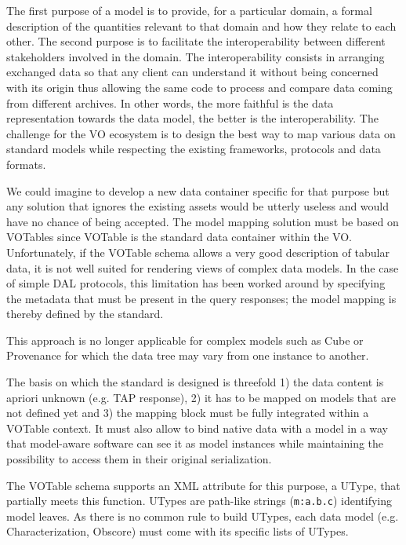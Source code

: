 
The first purpose of a model is to provide, for a particular domain, a formal description of the quantities relevant to that domain and how they relate to each other.
The second purpose is to facilitate the interoperability between  different stakeholders involved in the domain. The interoperability consists in arranging exchanged data 
so that any client can understand it without being concerned with its origin thus allowing the same code to process and compare data coming from different archives.  
In other words, the more faithful is the data representation towards the data model, the better is the interoperability.
The challenge for the VO ecosystem is to design the best way to map various data on standard models while respecting the existing frameworks, protocols and data formats.

We could imagine to develop a new data container specific for that purpose but any solution that ignores the existing assets would be utterly useless and would have no chance of being accepted.
The model mapping solution must be based on VOTables since VOTable  \citep{2019ivoa.spec.1021O} is the standard data container within the VO.
Unfortunately, if the VOTable schema allows a very good description of tabular data, it is not well suited for rendering views of complex data models.
In the case of simple DAL protocols, this limitation has been worked around by specifying the metadata that must be present in the query responses; the model mapping is thereby defined by the standard.

This approach is no longer applicable for complex models such as Cube or Provenance for which the data tree may vary from one instance to another.

The basis on which the standard is designed is threefold 1) the data content is apriori unknown (e.g. TAP response), 2) it has to be mapped on models that are not defined yet and 3) the mapping block must be fully integrated within a VOTable context.
It must also allow to bind native data with a model in a way that model-aware software can see it as model instances while maintaining the possibility to access them in their original serialization.

The VOTable schema supports an XML attribute for this purpose, a UType, that partially meets this function. 
UTypes are path-like strings (\texttt{m:a.b.c}) identifying model leaves. As there is no common rule to build UTypes,  each data model (e.g. Characterization, Obscore)  must come with its specific lists of UTypes. 

